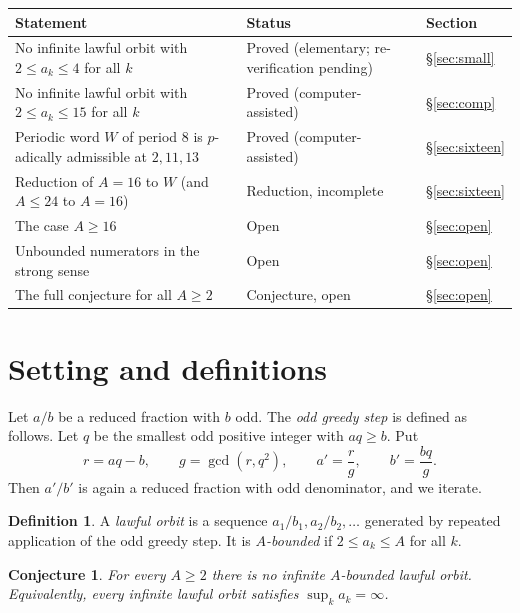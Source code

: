 \documentclass[11pt]{amsart}
\theoremstyle{plain}
\newtheorem{conjecture}[theorem]{Conjecture}
\theoremstyle{definition}
\newtheorem{definition}[theorem]{Definition}
\theoremstyle{remark}
\begin{document}
\begin{center}
\begin{tabular}{p{} p{} p{}}
\hline
Statement & Status & Section\\
\hline
No infinite lawful orbit with $2\le a_k\le 4$ for all $k$ & Proved (elementary; re-verification pending) & \S\ref{sec:small}\\
No infinite lawful orbit with $2\le a_k\le 15$ for all $k$ & Proved (computer-assisted) & \S\ref{sec:comp}\\
Periodic word $W$ of period $8$ is $p$-adically admissible at $2,11,13$ & Proved (computer-assisted) & \S\ref{sec:sixteen}\\
Reduction of $A=16$ to $W$ (and $A\le 24$ to $A=16$) & Reduction, incomplete & \S\ref{sec:sixteen}\\
The case $A\ge 16$ & Open & \S\ref{sec:open}\\
Unbounded numerators in the strong sense & Open & \S\ref{sec:open}\\
The full conjecture for all $A\ge 2$ & Conjecture, open & \S\ref{sec:open}\\
\hline
\end{tabular}
\end{center}

\section{Setting and definitions}\label{sec:setting}

Let $a/b$ be a reduced fraction with $b$ odd. The \emph{odd greedy step} is defined as follows. Let $q$ be the smallest odd positive integer with $aq\ge b$. Put
\[
r = aq-b,\qquad g=\gcd(r,q^2),\qquad a' = \frac{r}{g},\qquad b' = \frac{bq}{g}.
\]
Then $a'/b'$ is again a reduced fraction with odd denominator, and we iterate.

\begin{definition}
A \emph{lawful orbit} is a sequence $a_1/b_1, a_2/b_2,\dots$ generated by repeated application of the odd greedy step. It is \emph{$A$-bounded} if $2\le a_k\le A$ for all $k$.
\end{definition}

\begin{conjecture}\label{conj:main}
For every $A\ge 2$ there is no infinite $A$-bounded lawful orbit. Equivalently, every infinite lawful orbit satisfies $\sup_k a_k=\infty$.
\end{conjecture}
\end{document}

